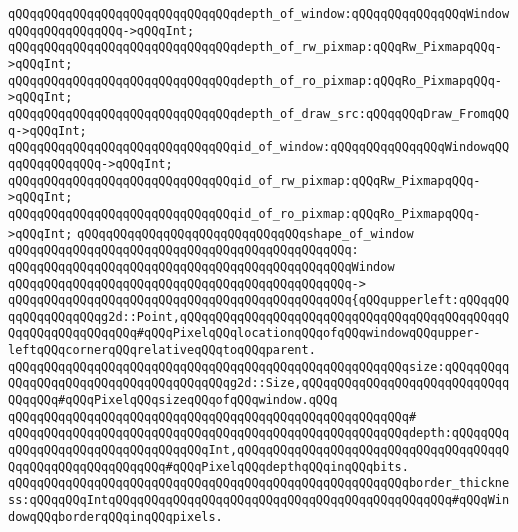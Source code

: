 \newline
\verb|qQQqqQQqqQQqqQQqqQQqqQQqqQQqqQQqdepth_of_window:qQQqqQQqqQQqqQQqWindowqQQqqQQqqQQqqQQq->qQQqInt;|\newline
\verb|qQQqqQQqqQQqqQQqqQQqqQQqqQQqqQQqdepth_of_rw_pixmap:qQQqRw_PixmapqQQq->qQQqInt;|\newline
\verb|qQQqqQQqqQQqqQQqqQQqqQQqqQQqqQQqdepth_of_ro_pixmap:qQQqRo_PixmapqQQq->qQQqInt;|\newline
\verb|qQQqqQQqqQQqqQQqqQQqqQQqqQQqqQQqdepth_of_draw_src:qQQqqQQqDraw_FromqQQq->qQQqInt;|\newline
\newline
\verb|qQQqqQQqqQQqqQQqqQQqqQQqqQQqqQQqid_of_window:qQQqqQQqqQQqqQQqWindowqQQqqQQqqQQqqQQq->qQQqInt;|\newline
\verb|qQQqqQQqqQQqqQQqqQQqqQQqqQQqqQQqid_of_rw_pixmap:qQQqRw_PixmapqQQq->qQQqInt;|\newline
\verb|qQQqqQQqqQQqqQQqqQQqqQQqqQQqqQQqid_of_ro_pixmap:qQQqRo_PixmapqQQq->qQQqInt;|\newline
\newline
\verb|qQQqqQQqqQQqqQQqqQQqqQQqqQQqqQQqshape_of_window|\newline
\verb|qQQqqQQqqQQqqQQqqQQqqQQqqQQqqQQqqQQqqQQqqQQqqQQq:|\newline
\verb|qQQqqQQqqQQqqQQqqQQqqQQqqQQqqQQqqQQqqQQqqQQqqQQqWindow|\newline
\verb|qQQqqQQqqQQqqQQqqQQqqQQqqQQqqQQqqQQqqQQqqQQqqQQq->|\newline
\verb|qQQqqQQqqQQqqQQqqQQqqQQqqQQqqQQqqQQqqQQqqQQqqQQq{qQQqupperleft:qQQqqQQqqQQqqQQqqQQqg2d::Point,qQQqqQQqqQQqqQQqqQQqqQQqqQQqqQQqqQQqqQQqqQQqqQQqqQQqqQQqqQQqqQQq#qQQqPixelqQQqlocationqQQqofqQQqwindowqQQqupper-leftqQQqcornerqQQqrelativeqQQqtoqQQqparent.|\newline
\verb|qQQqqQQqqQQqqQQqqQQqqQQqqQQqqQQqqQQqqQQqqQQqqQQqqQQqqQQqsize:qQQqqQQqqQQqqQQqqQQqqQQqqQQqqQQqqQQqqQQqg2d::Size,qQQqqQQqqQQqqQQqqQQqqQQqqQQqqQQqqQQq#qQQqPixelqQQqsizeqQQqofqQQqwindow.qQQq|\newline
\verb|qQQqqQQqqQQqqQQqqQQqqQQqqQQqqQQqqQQqqQQqqQQqqQQqqQQqqQQq#|\newline
\verb|qQQqqQQqqQQqqQQqqQQqqQQqqQQqqQQqqQQqqQQqqQQqqQQqqQQqqQQqdepth:qQQqqQQqqQQqqQQqqQQqqQQqqQQqqQQqqQQqInt,qQQqqQQqqQQqqQQqqQQqqQQqqQQqqQQqqQQqqQQqqQQqqQQqqQQqqQQqqQQq#qQQqPixelqQQqdepthqQQqinqQQqbits.|\newline
\verb|qQQqqQQqqQQqqQQqqQQqqQQqqQQqqQQqqQQqqQQqqQQqqQQqqQQqqQQqborder_thickness:qQQqqQQqIntqQQqqQQqqQQqqQQqqQQqqQQqqQQqqQQqqQQqqQQqqQQqqQQq#qQQqWindowqQQqborderqQQqinqQQqpixels.|\newline
